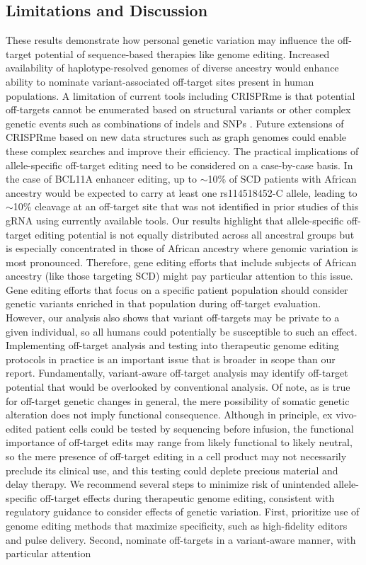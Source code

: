 \documentclass[a4paper, titlepage, openright]{book}
\newcommand{\crisprme}{CRISPRme\xspace}
\begin{document}
\subsection{ Limitations and Discussion}
These results demonstrate how personal genetic variation may influence the off-target potential of sequence-based therapies like genome editing. Increased availability of haplotype-resolved genomes of diverse ancestry would enhance ability to nominate variant-associated off-target sites present in human populations. A limitation of current tools including \crisprme is that potential off-targets cannot be enumerated based on structural variants or other complex genetic events such as combinations of indels and SNPs \citep{cancellieri2023human}. Future extensions of CRISPRme based on new data structures such as graph genomes \citep{paten2017genome, garrison2018variation} could enable these complex searches and improve their efficiency. The practical implications of allele-specific off-target editing need to be considered on a case-by-case basis.  In the case of BCL11A enhancer editing, up to $\sim$10\% of SCD patients with African ancestry would be expected to carry at least one rs114518452-C allele, leading to $\sim$10\% cleavage at an off-target site that was not identified in prior studies of this gRNA using currently available tools. Our results highlight that allele-specific off-target editing potential is not equally distributed across all ancestral groups but is especially concentrated in those of African ancestry where genomic variation is most pronounced. Therefore, gene editing efforts that include subjects of African ancestry (like those targeting SCD) might pay particular attention to this issue. Gene editing efforts that focus on a specific patient population should consider genetic variants enriched in that population during off-target evaluation. However, our analysis also shows that variant off-targets may be private to a given individual, so all humans could potentially be susceptible to such an effect. Implementing off-target analysis and testing into therapeutic genome editing protocols in practice is an important issue that is broader in scope than our report. Fundamentally, variant-aware off-target analysis may identify off-target potential that would be overlooked by conventional analysis. Of note, as is true for off-target genetic changes in general, the mere possibility of somatic genetic alteration does not imply functional consequence. Although in principle, ex vivo-edited patient cells could be tested by sequencing before infusion, the functional importance of off-target edits may range from likely functional to likely neutral, so the mere presence of off-target editing in a cell product may not necessarily preclude its clinical use, and this testing could deplete precious material and delay therapy. We recommend several steps to minimize risk of unintended allele-specific off-target effects during therapeutic genome editing, consistent with regulatory guidance to consider effects of genetic variation. First, prioritize use of genome editing methods that maximize specificity, such as high-fidelity editors and pulse delivery. Second, nominate off-targets in a variant-aware manner, with particular attention 
\end{document}
